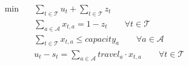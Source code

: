 \begin{align}
  \min\quad & \sum_{t \in \mathcal{T}} u_{t} + \sum_{t \in \mathcal{T}} z_{t} \tag{total\_cost} \\
  & \sum_{a \in \mathcal{A}} x_{t,a} = 1 - z_{t} \qquad \forall t \in \mathcal{T} \tag{assign\_flow} \\
  & \sum_{t \in \mathcal{T}} x_{t,a} \le capacity_{a} \qquad \forall a \in \mathcal{A} \tag{capacity} \\
  & u_{t} - s_{t} = \sum_{a \in \mathcal{A}} travel_{a} \cdot x_{t,a} \qquad \forall t \in \mathcal{T} \tag{timing} \\
\end{align}